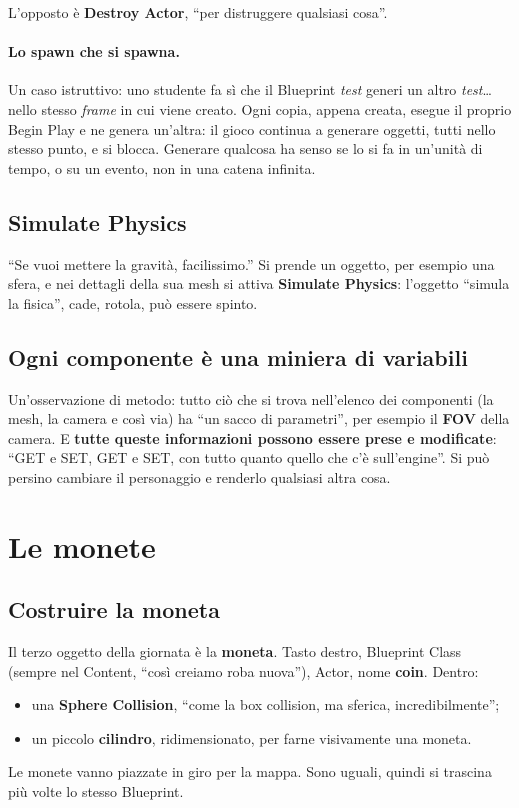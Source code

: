 L'opposto è \textbf{Destroy Actor}, ``per distruggere qualsiasi cosa''.

\paragraph{Lo spawn che si spawna.} Un caso istruttivo: uno studente fa sì
che il Blueprint \emph{test} generi un altro \emph{test}\dots{} nello stesso
\emph{frame} in cui viene creato. Ogni copia, appena creata, esegue il
proprio Begin Play e ne genera un'altra: il gioco continua a generare oggetti,
tutti nello stesso punto, e si blocca. Generare qualcosa ha senso se lo si fa
in un'unità di tempo, o su un evento, non in una catena infinita.

\subsection{Simulate Physics}

``Se vuoi mettere la gravità, facilissimo.'' Si prende un oggetto, per
esempio una sfera, e nei dettagli della sua mesh si attiva \textbf{Simulate
Physics}: l'oggetto ``simula la fisica'', cade, rotola, può essere spinto.

\subsection{Ogni componente è una miniera di variabili}

Un'osservazione di metodo: tutto ciò che si trova nell'elenco dei componenti
(la mesh, la camera e così via) ha ``un sacco di parametri'', per esempio il
\textbf{FOV} della camera. E \textbf{tutte queste informazioni possono essere
prese e modificate}: ``GET e SET, GET e SET, con tutto quanto quello che c'è
sull'engine''. Si può persino cambiare il personaggio e renderlo qualsiasi
altra cosa.

\section{Le monete}
\label{gd7:sec:monete}

\subsection{Costruire la moneta}

Il terzo oggetto della giornata è la \textbf{moneta}. Tasto destro,
Blueprint Class (sempre nel Content, ``così creiamo roba nuova''), Actor,
nome \textbf{coin}. Dentro:
\begin{itemize}
  \item una \textbf{Sphere Collision}, ``come la box collision, ma sferica,
        incredibilmente'';
  \item un piccolo \textbf{cilindro}, ridimensionato, per farne
        visivamente una moneta.
\end{itemize}
Le monete vanno piazzate in giro per la mappa. Sono uguali, quindi si
trascina più volte lo stesso Blueprint.

